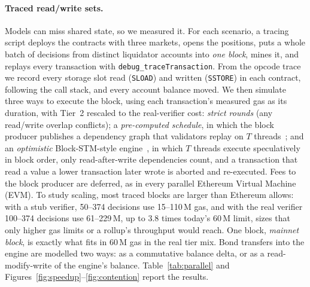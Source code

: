 \documentclass[sigconf,nonacm]{acmart}
\newcommand{\code}[1]{\texttt{\smaller #1}}
\begin{document}
\paragraph{Traced read/write sets.}
\label{sec:eval-traces}
Models can miss shared state, so we measured it. For each scenario, a tracing script deploys the contracts with three markets, opens the positions, puts a whole batch of decisions from distinct liquidator accounts into \emph{one block}, mines it, and replays every transaction with \code{debug\_traceTransaction}. From the opcode trace we record every storage slot read (\code{SLOAD}) and written (\code{SSTORE}) in each contract, following the call stack, and every account balance moved. We then simulate three ways to execute the block, using each transaction's measured gas as its duration, with Tier~2 rescaled to the real-verifier cost: \emph{strict rounds} (any read/write overlap conflicts); a \emph{pre-computed schedule}, in which the block producer publishes a dependency graph that validators replay on $T$ threads~\cite{dickerson2017adding,anjana2019efficient}; and an \emph{optimistic} Block-STM-style engine~\cite{gelashvili2023blockstm}, in which $T$ threads execute speculatively in block order, only read-after-write dependencies count, and a transaction that read a value a lower transaction later wrote is aborted and re-executed. Fees to the block producer are deferred, as in every parallel Ethereum Virtual Machine (EVM). To study scaling, most traced blocks are larger than Ethereum allows: with a stub verifier, 50--374 decisions use 15--110\,M gas, and with the real verifier 100--374 decisions use 61--229\,M, up to 3.8 times today's 60\,M limit, sizes that only higher gas limits or a rollup's throughput would reach. One block, \emph{mainnet block}, is exactly what fits in 60\,M gas in the real tier mix. Bond transfers into the engine are modelled two ways: as a commutative balance delta, or as a read-modify-write of the engine's balance. Table~\ref{tab:parallel} and Figures~\ref{fig:speedup}--\ref{fig:contention} report the results.
\end{document}
